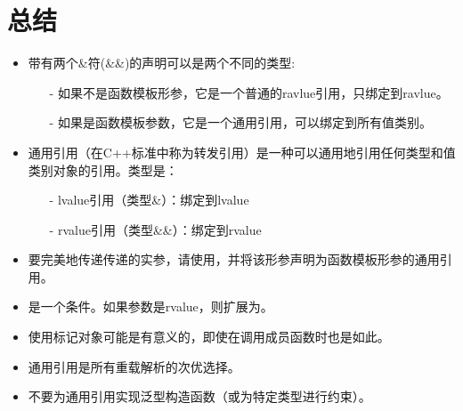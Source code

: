 \section{总结}
\begin{itemize}
	\item 带有两个\&符(\&\&)的声明可以是两个不同的类型:
	\begin{itemize}
		\item[-] 如果不是函数模板形参，它是一个普通的ravlue引用，只绑定到ravlue。
		\item[-] 如果是函数模板参数，它是一个通用引用，可以绑定到所有值类别。
	\end{itemize}
	\item 通用引用（在C++标准中称为转发引用）是一种可以通用地引用任何类型和值类别对象的引用。类型是：
		\begin{itemize}
		\item[-] lvalue引用（类型\&）：绑定到lvalue
		\item[-] rvalue引用（类型\&\&）：绑定到rvalue
	\end{itemize}
	\item 要完美地传递传递的实参，请使用，并将该形参声明为函数模板形参的通用引用。
	\item {}是一个条件。如果参数是rvalue，则扩展为。
	\item 使用标记对象可能是有意义的，即使在调用成员函数时也是如此。
	\item 通用引用是所有重载解析的次优选择。
	\item 不要为通用引用实现泛型构造函数（或为特定类型进行约束）。
\end{itemize}


